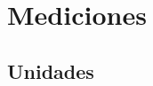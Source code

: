 \documentclass{article}
\begin{document}



\chapter{Mediciones}

\section{Unidades}



% 
\end{document}
